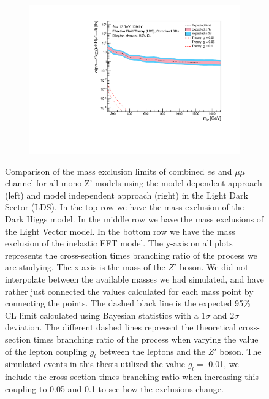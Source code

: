 \documentclass[12pt, a4paper]{book}
\begin{document}
\begin{figure}[!ht]
\begin{subfigure}[b]{0.49\textwidth}
   \end{subfigure}
   \hfill
   \begin{subfigure}[b]{0.49\textwidth}
      \centering
      \includegraphics[width=1\textwidth]{Limits/Model_independent/EFT_LDS/mass_exclusion_comb.pdf}
   \end{subfigure}
   \caption[Comparison of mass exclusion limits of dilepton channel for all mono-Z' models using the model dependent and independent approach in the LDS]{Comparison of the mass exclusion limits of combined $ee$ and $\mu\mu$ channel for all mono-Z' models using the model dependent approach (left) and model independent approach (right) in the Light Dark Sector (LDS). 
   In the top row we have the mass exclusion of the Dark Higgs model. In the middle row we have the mass exclusions of the Light Vector model. In the bottom row we have the mass exclusion of the inelastic EFT model.
   The y-axis on all plots represents the cross-section times branching ratio of the process we are studying. The x-axis is the mass of the $Z'$ boson. We did not interpolate between the available masses we had simulated, 
   and have rather just connected the values calculated for each mass point by connecting the points. The dashed black line is the expected 95\% CL limit calculated using Bayesian statistics with a 1$\sigma$ and 2$\sigma$ deviation. 
   The different dashed lines represent the theoretical cross-section times branching ratio of the process when varying the value of the lepton coupling $g_l$ between the leptons and the $Z'$ boson. The simulated events in this thesis utilized the value $g_l=$ 0.01, we include the cross-section times branching ratio when increasing this coupling to 0.05 and 0.1 to see how the exclusions change. 
   }\label{fig:comp_LDS}
\end{figure}


\clearpage
\end{document}
